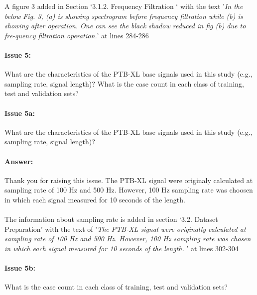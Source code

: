 \documentclass{article}
\begin{document}
A figure 3 added in Section `3.1.2. Frequency Filtration ` with the text '\textit{In the below Fig. 3, (a) is showing spectrogram before frequency filtration while (b) is showing after operation. One can see the black shadow reduced in fig (b) due to fre-quency filtration operation.}' at lines 284-286

\paragraph{Issue 5:}
\begin{displayquote}
What are the characteristics of the PTB-XL base signals used in this study (e.g., sampling rate, signal length)? What is the case count in each class of training, test and validation sets?
\end{displayquote}

\paragraph{Issue 5a:}
\begin{displayquote}
What are the characteristics of the PTB-XL base signals used in this study (e.g., sampling rate, signal length)? 
\end{displayquote}

\paragraph{Answer:}
Thank you for raising this issue. The PTB-XL signal were originaly calculated at sampling rate of 100 Hz and 500 Hz. However, 100 Hz sampling rate was choosen in which each signal measured for 10 seconds of the length. \\\\

The information about sampling rate is added in section `3.2. Dataset Preparation' with the text of '\textit{The PTB-XL signal were originally calculated at sampling rate of 100 Hz and 500 Hz. However, 100 Hz sampling rate was chosen in which each signal measured for 10 seconds of the length. }' at lines 302-304

\paragraph{Issue 5b:}
\begin{displayquote}
What is the case count in each class of training, test and validation sets?
\end{displayquote}
\end{document}
